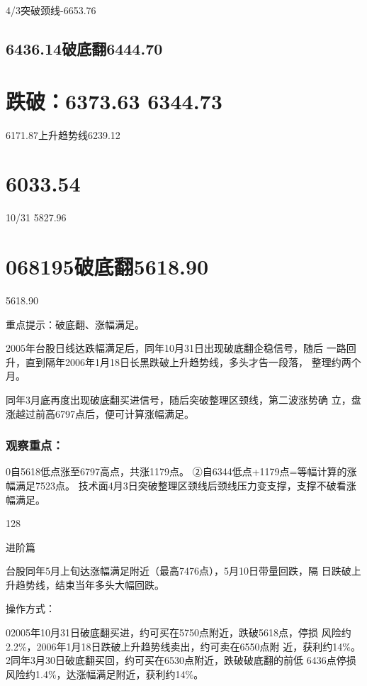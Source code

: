 \documentclass{article}
\begin{document}
4/3突破颈线-6653.76

\subsection{6436.14破底翻6444.70}

\section{跌破：6373.63 6344.73}

6171.87上升趋势线6239.12

\section{6033.54}

10/31 5827.96

\section{068195破底翻5618.90}

5618.90

重点提示：破底翻、涨幅满足。

2005年台股日线达跌幅满足后，同年10月31日出现破底翻企稳信号，随后 一路回升，直到隔年2006年1月18日长黑跌破上升趋势线，多头才告一段落， 整理约两个月。

同年3月底再度出现破底翻买进信号，随后突破整理区颈线，第二波涨势确 立，盘涨越过前高6797点后，便可计算涨幅满足。

\subsubsection{观察重点：}

0自5618低点涨至6797高点，共涨1179点。 ②自6344低点+1179点=等幅计算的涨幅满足7523点。 技术面4月3日突破整理区颈线后颈线压力变支撑，支撑不破看涨幅满足。

128

\clearpage

进阶篇

台股同年5月上旬达涨幅满足附近（最高7476点），5月10日带量回跌，隔 日跌破上升趋势线，结束当年多头大幅回跌。

操作方式：

02005年10月31日破底翻买进，约可买在5750点附近，跌破5618点，停损 风险约2.2\%，2006年1月18日跌破上升趋势线卖出，约可卖在6550点附 近，获利约14\%。 2同年3月30日破底翻买回，约可买在6530点附近，跌破破底翻的前低 6436点停损风险约1.4\%，达涨幅满足附近，获利约14\%。
\end{document}
